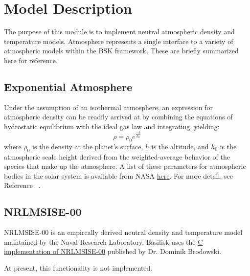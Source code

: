 
\section{Model Description}

The purpose of this module is to implement neutral atmospheric density and temperature models.
Atmosphere represents a single interface to a variety of atmospheric models within the BSK framework. These are briefly summarized here for reference.


\subsection{Exponential Atmosphere}
Under the assumption of an isothermal atmosphere, an expression for atmospheric density can be readily arrived at by combining the equations of hydrostatic equilibrium with the ideal gas law and integrating, yielding:
\begin{equation}
\label{eq:expAtmo}
\rho = \rho_0 e^{\frac{-h}{h_0}}
\end{equation}
where $\rho_0$ is the density at the planet's surface, $h$ is the altitude, and $h_0$ is the atmospheric scale height derived from the weighted-average behavior of the species that make up the atmosphere. A list of these parameters
for atmospheric bodies in the solar system is available from NASA \href{https://nssdc.gsfc.nasa.gov/planetary/planetfact.html}{here}. For more detail, see Reference ~\cite{vallado2013}. 

\subsection{NRLMSISE-00}
NRLMSISE-00 is an empircally derived neutral density and temperature model maintained by the Naval Research Laboratory. Basilisk uses the \href{https://www.brodo.de/space/nrlmsise/index.html}{C implementation of NRLMSISE-00} published by Dr. Dominik Brodowski.

At present, this functionality is not implemented.